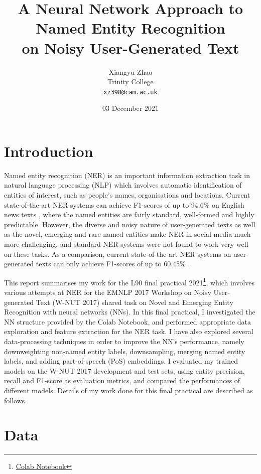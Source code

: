 \documentclass[11pt,a4paper]{article}
\title{A Neural Network Approach to Named Entity Recognition \\ on Noisy User-Generated Text}
\author{Xiangyu Zhao \\
    Trinity College \\
    \texttt{xz398@cam.ac.uk} \\}
\date{03 December 2021}
\begin{document}
\maketitle

\section{Introduction}

Named entity recognition (NER) is an important information extraction task in natural language processing (NLP) which involves automatic identification of entities of interest, such as people's names, organisations and locations. Current state-of-the-art NER systems can achieve F1-scores of up to 94.6\% on English news texts \citep{wang-etal-2021-automated}, where the named entities are fairly standard, well-formed and highly predictable. However, the diverse and noisy nature of user-generated texts as well as the novel, emerging and rare named entities make NER in social media much more challenging, and standard NER systems were not found to work very well on these tasks. As a comparison, current state-of-the-art NER systems on user-generated texts can only achieve F1-scores of up to 60.45\% \citep{wang-etal-2021-improving}.

This report summarises my work for the L90 final practical 2021\footnote{\href{https://colab.research.google.com/drive/1Jw437OCJ-UQskMZJnLFQlTYNNH-rX4PA?usp=sharing}{Colab Notebook}}, which involves various attempts at NER for the EMNLP 2017 Workshop on Noisy User-generated Text (W-NUT 2017) shared task on Novel and Emerging Entity Recognition \citep{derczynski-etal-2017-results} with neural networks (NNs). In this final practical, I investigated the NN structure provided by the Colab Notebook, and performed appropriate data exploration and feature extraction for the NER task. I have also explored several data-processing techniques in order to improve the NN's performance, namely downweighting non-named entity labels, downsampling, merging named entity labels, and adding part-of-speech (PoS) embeddings. I evaluated my trained models on the W-NUT 2017 development and test sets, using entity precision, recall and F1-score as evaluation metrics, and compared the performances of different models. Details of my work done for this final practical are described as follows.

\section{Data}
\end{document}
